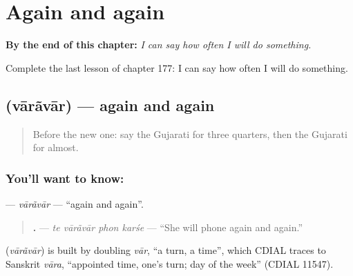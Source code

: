 
\chapter{Again and again}
\label{ch:gu-again-and-again}

\begin{chapteropening}
\textbf{By the end of this chapter:} \emph{I can say how often I will do something.}

Complete the last lesson of chapter 177: I can say how often I will do something.
\end{chapteropening}

\section[\texorpdfstring{\gu{વારંવાર} (vārãvār)}{વારંવાર (vārãvār)}]{ (vārãvār) — again and again}

\label{lesson:GU-C177-varavar}



\begin{quote}
Before the new one: say the Gujarati for three quarters, then the Gujarati for almost.
\end{quote}

\subsection*{You'll want to know: }
\textbf{} — \emph{vārãvār} — \textquotedblleft{}again and again\textquotedblright{}.

\begin{quote}
\textbf{   .} — \emph{te vārãvār phon karśe} — \textquotedblleft{}She will phone again and again.\textquotedblright{}
\end{quote}

\begin{cousinweb}
\textbf{} (\emph{vārãvār}) is built by doubling \emph{vār}, \textquotedblleft{}a turn, a time\textquotedblright{}, which CDIAL traces to Sanskrit \emph{vāra}, \textquotedblleft{}appointed time, one's turn; day of the week\textquotedblright{} (CDIAL 11547).
\end{cousinweb}

